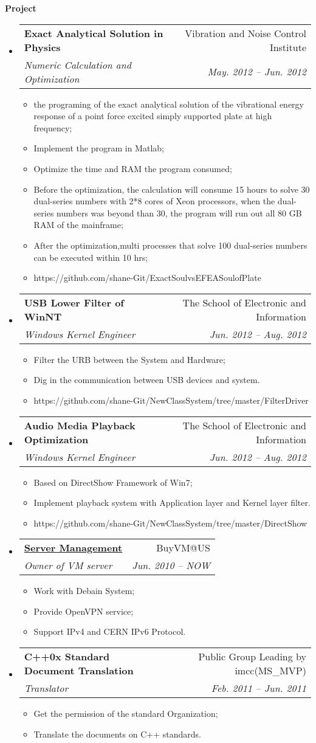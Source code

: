 \documentclass[letterpaper,11pt]{article}
\makeatletter
\newcommand{\resitem}[1]{\item #1 \vspace{-2pt}}
\newcommand{\resheading}[1]{{\large \colorbox{mygrey}{\begin{minipage}{\textwidth}{\textbf{#1 \vphantom{p\^{E}}}}\end{minipage}}}}
\newcommand{\ressubheading}[4]{
\begin{tabular*}{6.5in}{l@{\extracolsep{\fill}}r}
		\textbf{#1} & #2 \\
		\textit{#3} & \textit{#4} \\
\end{tabular*}\vspace{-6pt}}
\makeatother
\begin{document}
\resheading{Project}
	\begin{itemize}
		\item 
			\ressubheading{Exact Analytical Solution in Physics}{Vibration and Noise Control Institute}{Numeric Calculation and Optimization}{May. 2012 -- Jun. 2012}
				{ \footnotesize
				\begin{itemize}
					\resitem{the programing of the exact analytical solution of the vibrational energy response of a point force excited simply supported plate at high frequency;}
					\resitem{Implement the program in Matlab;}
					\resitem{Optimize the time and RAM the program consumed;}
					\resitem{Before the optimization, the calculation will consume 15 hours to solve 30 dual-series numbers with 2*8 cores of Xeon processors, when the dual-series numbers was beyond than 30, the program will run out all 80 GB RAM of the mainframe;}
					\resitem{After the optimization,multi processes that solve 100 dual-series numbers can be executed within 10 hrs;}
					\resitem{https://github.com/shane-Git/ExactSoulvsEFEASoulofPlate}
				\end{itemize}
				}
		\item 
			\ressubheading{USB Lower Filter of WinNT}{The School of Electronic and Information}{Windows Kernel Engineer}{Jun. 2012 -- Aug. 2012}
				{ \footnotesize
				\begin{itemize}
					\resitem{Filter the URB between the System and Hardware;}
					\resitem{Dig in the communication between USB devices and system.}
					\resitem{https://github.com/shane-Git/NewClassSystem/tree/master/FilterDriver}
				\end{itemize}
				}
		\item 
			\ressubheading{Audio Media Playback Optimization}{The School of Electronic and Information}{Windows Kernel Engineer}{Jun. 2012 -- Aug. 2012}
				{ \footnotesize
				\begin{itemize}
					\resitem{Based on DirectShow Framework of Win7;}
					\resitem{Implement playback system with Application layer and Kernel layer filter.}
					\resitem{https://github.com/shane-Git/NewClassSystem/tree/master/DirectShow}
				\end{itemize}
				}
		\item 
			\ressubheading{\href{http://svr6.haohaizi.us/}{Server Management}}{BuyVM@US}{Owner of VM server}{Jun. 2010 -- NOW}
				{ \footnotesize
				\begin{itemize}
					\resitem{Work with Debain System;}
					\resitem{Provide OpenVPN service;}
					\resitem{Support IPv4 and CERN IPv6 Protocol.}
				\end{itemize}
				}
		\item
			\ressubheading{C++0x Standard Document Translation}{Public Group Leading by imcc(MS\_MVP)}{Translator} {Feb. 2011 -- Jun. 2011}
				{ \footnotesize
				\begin{itemize}
					\resitem{Get the permission of the standard Organization;}
					\resitem{Translate the documents on C++ standards.}
				\end{itemize}
          		}
	\end{itemize}		
	
\end{document}
